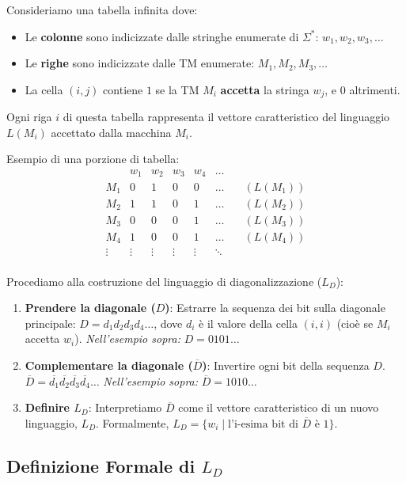 \documentclass[a4paper]{article}
\begin{document}
Consideriamo una tabella infinita dove:
\begin{itemize}
    \item Le \textbf{colonne} sono indicizzate dalle stringhe enumerate di $\Sigma^*$: $w_1, w_2, w_3, \dots$
    \item Le \textbf{righe} sono indicizzate dalle TM enumerate: $M_1, M_2, M_3, \dots$
    \item La cella $(i, j)$ contiene $1$ se la TM $M_i$ \textbf{accetta} la stringa $w_j$, e $0$ altrimenti.
\end{itemize}
Ogni riga $i$ di questa tabella rappresenta il vettore caratteristico del linguaggio $L(M_i)$ accettato dalla macchina $M_i$.

Esempio di una porzione di tabella:
\[
\begin{array}{c|cccccc}
        & w_1 & w_2 & w_3 & w_4 & \dots \\
    \hline
    M_1 & 0 & 1 & 0 & 0 & \dots & \quad (L(M_1)) \\
    M_2 & 1 & 1 & 0 & 1 & \dots & \quad (L(M_2)) \\
    M_3 & 0 & 0 & 0 & 1 & \dots & \quad (L(M_3)) \\
    M_4 & 1 & 0 & 0 & 1 & \dots & \quad (L(M_4)) \\
    \vdots & \vdots & \vdots & \vdots & \vdots & \ddots \\
\end{array}
\]

Procediamo alla costruzione del linguaggio di diagonalizzazione ($L_D$):
\begin{enumerate}
    \item \textbf{Prendere la diagonale ($D$)}: Estrarre la sequenza dei bit sulla diagonale principale: $D = d_1 d_2 d_3 d_4 \dots$, dove $d_i$ è il valore della cella $(i,i)$ (cioè se $M_i$ accetta $w_i$).
    \textit{Nell'esempio sopra:} $D = 0101\dots$
    \item \textbf{Complementare la diagonale ($\overline{D}$)}: Invertire ogni bit della sequenza $D$.
    $\overline{D} = \overline{d_1} \overline{d_2} \overline{d_3} \overline{d_4} \dots$
    \textit{Nell'esempio sopra:} $\overline{D} = 1010\dots$
    \item \textbf{Definire $L_D$}: Interpretiamo $\overline{D}$ come il vettore caratteristico di un nuovo linguaggio, $L_D$.
    Formalmente, $L_D = \{ w_i \mid \text{l'i-esima bit di } \overline{D} \text{ è } 1 \}$.
\end{enumerate}

\subsection{Definizione Formale di $L_D$}
\end{document}
